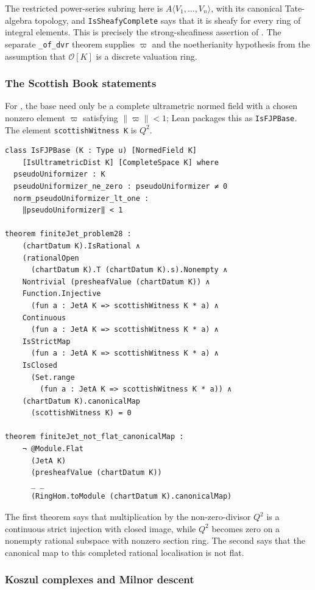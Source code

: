 \documentclass[11pt,reqno]{amsart}
\theoremstyle{definition}
\begin{document}
The restricted power-series subring here is
\(A\langle V_1,\ldots,V_n\rangle\), with its canonical Tate-algebra topology,
and \texttt{IsSheafyComplete} says that it is sheafy for every ring of integral
elements.  This is precisely the strong-sheafiness assertion of
.  The separate
\texttt{\_of\_dvr} theorem supplies \(\varpi\) and the noetherianity hypothesis
from the assumption that \(\mathcal O[K]\) is a discrete valuation ring.

\subsubsection{The Scottish Book statements}

For , the base need only be a complete ultrametric
normed field with a chosen nonzero element \(\varpi\) satisfying
\(\lVert\varpi\rVert<1\); Lean packages this as \texttt{IsFJPBase}.  The element
\texttt{scottishWitness K} is \(Q^2\).

\begin{lstlisting}
class IsFJPBase (K : Type u) [NormedField K]
    [IsUltrametricDist K] [CompleteSpace K] where
  pseudoUniformizer : K
  pseudoUniformizer_ne_zero : pseudoUniformizer ≠ 0
  norm_pseudoUniformizer_lt_one :
    ‖pseudoUniformizer‖ < 1

theorem finiteJet_problem28 :
    (chartDatum K).IsRational ∧
    (rationalOpen
      (chartDatum K).T (chartDatum K).s).Nonempty ∧
    Nontrivial (presheafValue (chartDatum K)) ∧
    Function.Injective
      (fun a : JetA K => scottishWitness K * a) ∧
    Continuous
      (fun a : JetA K => scottishWitness K * a) ∧
    IsStrictMap
      (fun a : JetA K => scottishWitness K * a) ∧
    IsClosed
      (Set.range
        (fun a : JetA K => scottishWitness K * a)) ∧
    (chartDatum K).canonicalMap
      (scottishWitness K) = 0

theorem finiteJet_not_flat_canonicalMap :
    ¬ @Module.Flat
      (JetA K)
      (presheafValue (chartDatum K))
      _ _
      (RingHom.toModule (chartDatum K).canonicalMap)
\end{lstlisting}

The first theorem says that multiplication by the non-zero-divisor \(Q^2\) is
a continuous strict injection with closed image, while \(Q^2\) becomes zero on
a nonempty rational subspace with nonzero section ring.  The second says that
the canonical map to this completed rational localisation is not flat.

\subsubsection{Koszul complexes and Milnor descent}
\end{document}
